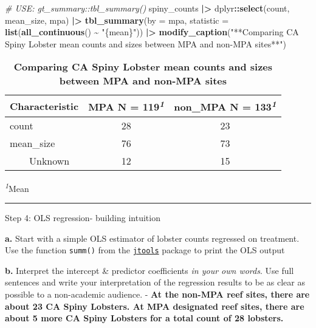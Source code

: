 \documentclass[
]{article}
\newenvironment{Shaded}{\begin{snugshade}}{\end{snugshade}}
\newcommand{\AttributeTok}[1]{\textcolor[rgb]{0.13,0.29,0.53}{#1}}
\newcommand{\CommentTok}[1]{\textcolor[rgb]{0.56,0.35,0.01}{\textit{#1}}}
\newcommand{\FunctionTok}[1]{\textcolor[rgb]{0.13,0.29,0.53}{\textbf{#1}}}
\newcommand{\NormalTok}[1]{#1}
\newcommand{\SpecialCharTok}[1]{\textcolor[rgb]{0.81,0.36,0.00}{\textbf{#1}}}
\newcommand{\StringTok}[1]{\textcolor[rgb]{0.31,0.60,0.02}{#1}}
\begin{document}
\begin{Shaded}
\begin{Highlighting}[]
\CommentTok{\# USE: gt\_summary::tbl\_summary()}
\NormalTok{ spiny\_counts }\SpecialCharTok{|\textgreater{}} 
\NormalTok{    dplyr}\SpecialCharTok{::}\FunctionTok{select}\NormalTok{(count, mean\_size, mpa) }\SpecialCharTok{|\textgreater{}}
    \FunctionTok{tbl\_summary}\NormalTok{(}\AttributeTok{by =}\NormalTok{ mpa,}
                \AttributeTok{statistic =} \FunctionTok{list}\NormalTok{(}\FunctionTok{all\_continuous}\NormalTok{() }\SpecialCharTok{\textasciitilde{}} \StringTok{"\{mean\}"}\NormalTok{)) }\SpecialCharTok{|\textgreater{}}
    \FunctionTok{modify\_caption}\NormalTok{(}\StringTok{"**Comparing CA Spiny Lobster mean counts and sizes between MPA and non{-}MPA sites**"}\NormalTok{)}
\end{Highlighting}
\end{Shaded}

\begin{table}[!t]
\caption{\label{tab:unnamed-chunk-9}\textbf{Comparing CA Spiny Lobster mean counts and sizes between MPA and non-MPA sites}} 
\fontsize{12.0pt}{14.4pt}\selectfont
\begin{tabular*}{\linewidth}{@{\extracolsep{\fill}}lcc}
\toprule
\textbf{Characteristic} & \textbf{MPA}  N = 119\textsuperscript{\textit{1}} & \textbf{non\_MPA}  N = 133\textsuperscript{\textit{1}} \\ 
\midrule\addlinespace[2.5pt]
count & 28 & 23 \\ 
mean\_size & 76 & 73 \\ 
    Unknown & 12 & 15 \\ 
\bottomrule
\end{tabular*}
\begin{minipage}{\linewidth}
\textsuperscript{\textit{1}}Mean\\
\end{minipage}
\end{table}

\begin{center}\rule{0.5\linewidth}{0.5pt}\end{center}

Step 4: OLS regression- building intuition

\textbf{a.} Start with a simple OLS estimator of lobster counts
regressed on treatment. Use the function \texttt{summ()} from the
\href{https://jtools.jacob-long.com/}{\texttt{jtools}} package to print
the OLS output

\textbf{b.} Interpret the intercept \& predictor coefficients \emph{in
your own words}. Use full sentences and write your interpretation of the
regression results to be as clear as possible to a non-academic
audience. - \textbf{At the non-MPA reef sites, there are about 23 CA
Spiny Lobsters. At MPA designated reef sites, there are about 5 more CA
Spiny Lobsters for a total count of 28 lobsters.}
\end{document}
